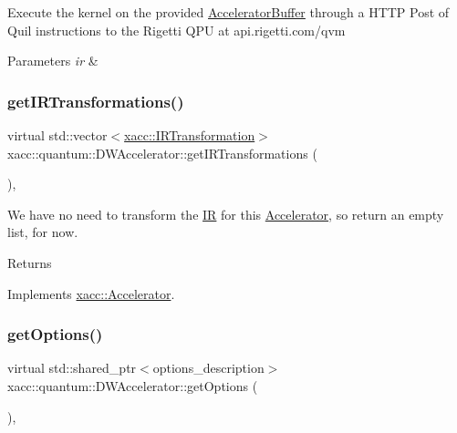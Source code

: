 Execute the kernel on the provided \hyperlink{a01625}{Accelerator\+Buffer} through a H\+T\+TP Post of Quil instructions to the Rigetti Q\+PU at api.\+rigetti.\+com/qvm


\begin{DoxyParams}{Parameters}
{\em ir} & \\
\hline
\end{DoxyParams}
\mbox{\label{a01133_a89da20bd079a22d6581ea2da2293b973}} 
\subsubsection{\texorpdfstring{get\+I\+R\+Transformations()}{getIRTransformations()}}
{\footnotesize\ttfamily virtual std\+::vector$<$\hyperlink{a01681}{xacc\+::\+I\+R\+Transformation}$>$ xacc\+::quantum\+::\+D\+W\+Accelerator\+::get\+I\+R\+Transformations (\begin{DoxyParamCaption}{ }\end{DoxyParamCaption})\hspace{0.3cm}{\ttfamily [inline]}, {\ttfamily [virtual]}}

We have no need to transform the \hyperlink{a01677}{IR} for this \hyperlink{a01613}{Accelerator}, so return an empty list, for now. \begin{DoxyReturn}{Returns}

\end{DoxyReturn}


Implements \hyperlink{a01613_ad6e4a642dcb24e552675bcbeff1e1b04}{xacc\+::\+Accelerator}.

\mbox{\label{a01133_a09926db9f99706307ae6ce5b56845bca}} 
\subsubsection{\texorpdfstring{get\+Options()}{getOptions()}}
{\footnotesize\ttfamily virtual std\+::shared\+\_\+ptr$<$options\+\_\+description$>$ xacc\+::quantum\+::\+D\+W\+Accelerator\+::get\+Options (\begin{DoxyParamCaption}{ }\end{DoxyParamCaption})\hspace{0.3cm}{\ttfamily [inline]}, {\ttfamily [virtual]}}

